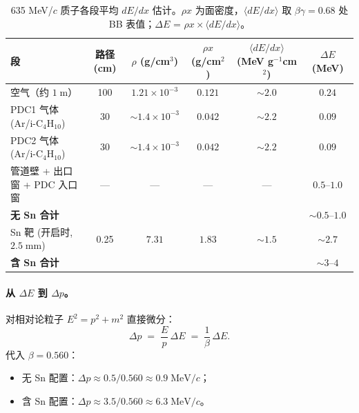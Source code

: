 \begin{table}[H]
  \centering
  \caption{635 MeV/$c$ 质子各段平均 $dE/dx$ 估计。$\rho x$ 为面密度，$\langle dE/dx\rangle$
           取 $\beta\gamma = 0.68$ 处 BB 表值；$\Delta E$ = $\rho x \times \langle dE/dx\rangle$。}
  \label{tab:dedx-segments}
  \begin{tabular}{lccccc}
    \toprule
    段     & 路径 (cm) & $\rho$ (g/cm$^3$) & $\rho x$ (g/cm$^2$) & $\langle dE/dx\rangle$ (MeV g$^{-1}$cm$^2$) & $\Delta E$ (MeV) \\
    \midrule
    空气（约 $1\;\mathrm{m}$）           & 100   & $1.21\times 10^{-3}$ & $0.121$ & $\sim 2.0$ & $0.24$ \\
    PDC1 气体 (Ar/i-C$_4$H$_{10}$)        & 30    & $\sim 1.4\times 10^{-3}$ & $0.042$ & $\sim 2.2$ & $0.09$ \\
    PDC2 气体 (Ar/i-C$_4$H$_{10}$)        & 30    & $\sim 1.4\times 10^{-3}$ & $0.042$ & $\sim 2.2$ & $0.09$ \\
    管道壁 + 出口窗 + PDC 入口窗         & ---  & ---   & ---  & ---       & $0.5\text{--}1.0$ \\
    \midrule
    \textbf{无 Sn 合计}                    &      &       &      &           & $\sim 0.5\text{--}1.0$ \\
    \midrule
    Sn 靶 (开启时, $2.5\;\mathrm{mm}$)    & 0.25  & $7.31$               & $1.83$ & $\sim 1.5$ & $\sim 2.7$ \\
    \midrule
    \textbf{含 Sn 合计}                    &       &       &      &           & $\sim 3\text{--}4$ \\
    \bottomrule
  \end{tabular}
\end{table}


\paragraph{从 \texorpdfstring{$\Delta E$}{ΔE} 到 \texorpdfstring{$\Delta p$}{Δp}。}
对相对论粒子 $E^2 = p^2 + m^2$ 直接微分：
\begin{equation}
  \Delta p \;=\; \frac{E}{p}\,\Delta E \;=\; \frac{1}{\beta}\,\Delta E.
\label{eq:dedx-to-dp}
\end{equation}
代入 $\beta = 0.560$：
\begin{itemize}
  \item 无 Sn 配置：$\Delta p \approx 0.5/0.560 \approx 0.9\;\mathrm{MeV}/c$；
  \item 含 Sn 配置：$\Delta p \approx 3.5/0.560 \approx 6.3\;\mathrm{MeV}/c$。
\end{itemize}

